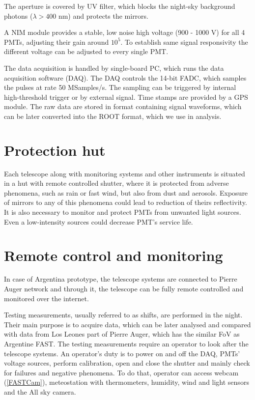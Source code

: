 \par
The aperture is covered by UV filter, which blocks the night-sky background photons ($\lambda > 400$ nm) and protects the mirrors.


\par
A NIM module provides a stable, low noise high voltage (900 - 1000 V) for all 4 PMTs, adjusting their gain around $10^5$. To establish same signal responsivity the different voltage can be adjusted to every single PMT.
\par
The data acquisition is handled by single-board PC, which runs the data acquisition software (DAQ). The DAQ controls the 14-bit FADC, which samples the pulses at rate 50 MSamples/s. The sampling can be triggered by internal high-threshold trigger or by external signal. Time stamps are provided by a GPS module. The raw data are stored in format containing signal waveforms, which can be later converted into the ROOT format, which we use in analysis.
\section{Protection hut}
Each telescope along with monitoring systems and other instruments is situated in a hut with remote controlled shutter, where it is protected from adverse phenomena, such as rain or fast wind, but also from dust and aerosols. Exposure of mirrors to any of this phenomena could lead to reduction of theirs reflectivity. It is also necessary to monitor and protect PMTs from unwanted light sources. Even a low-intensity sources could decrease PMT's service life.

\section{Remote control and monitoring}
In case of Argentina prototype, the telescope systems are connected to Pierre Auger network and through it, the telescope can be fully remote controlled and monitored over the internet. 

\par
Testing measurements, usually referred to as shifts, are performed in the night. Their main purpose is to acquire data, which can be later analysed and compared with data from Los Leones part of Pierre Auger, which has the similar FoV as Argentine FAST. 
The testing measurements require an operator to look after the telescope systems. An operator's duty is to power on and off the DAQ, PMTs' voltage sources, perform calibration, open and close the shutter and mainly check for failures and negative phenomena. To do that, operator can access webcam (\ref{FASTCam}), meteostation with thermometers, humidity, wind and light sensors and the All sky camera.

